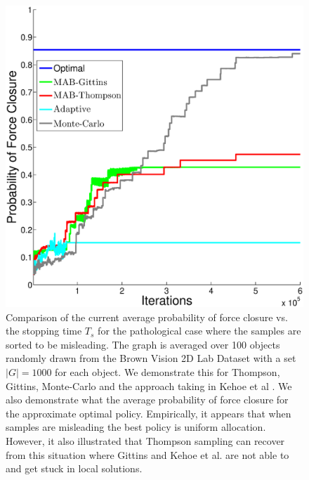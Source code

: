 \documentclass[10pt, conference]{ieeeconf}      %
\begin{document}
\begin{figure}[ht!]
\centering
\includegraphics[scale=0.25]{matlab_figures/worst_case.eps}
\caption{ \footnotesize Comparison of the current average probability of force closure vs. the stopping time $T_s$ for the pathological case where the samples are sorted to be misleading. The graph is averaged over 100 objects randomly drawn from the Brown Vision 2D Lab Dataset \cite{brown} with a set $|G|=1000$ for each object.  We demonstrate this for Thompson, Gittins, Monte-Carlo and the approach taking in Kehoe et al \cite{kehoe2012toward}. We also demonstrate what the average probability of force closure for the approximate optimal policy. Empirically, it appears that when samples are misleading the best policy is uniform allocation. However, it also illustrated that Thompson sampling can recover from this situation where Gittins and Kehoe et al.  are not able to and get stuck in local solutions. }
\vspace*{-10pt}
\label{fig:worst_case}
\end{figure}
\end{document}
